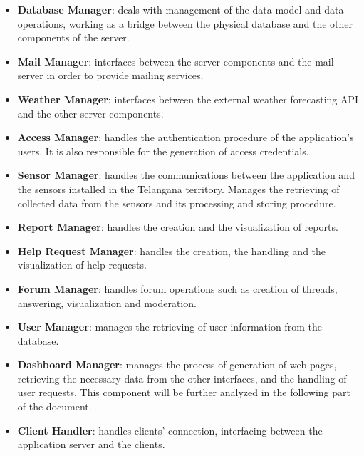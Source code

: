 \documentclass[10pt]{article} %
\begin{document}
\begin{itemize}
    \item \textbf{Database Manager}: deals with management of the data model and data operations, working as a bridge between the physical database 
    and the other components of the server.
    \item \textbf{Mail Manager}: interfaces between the server components and the mail server in order to provide mailing services.
    \item \textbf{Weather Manager}: interfaces between the external weather forecasting API and the other server components.
    \item \textbf{Access Manager}: handles the authentication procedure of the application's users. It is also responsible for the generation of access credentials.
    \item \textbf{Sensor Manager}: handles the communications between the application and the sensors installed in the Telangana territory. Manages the retrieving of 
        collected data from the sensors and its processing and storing procedure.
    \item \textbf{Report Manager}: handles the creation and the visualization of reports.
    \item \textbf{Help Request Manager}: handles the creation, the handling and the visualization of help requests.
    \item \textbf{Forum Manager}: handles forum operations such as creation of threads, answering, visualization and moderation.
    \item \textbf{User Manager}: manages the retrieving of user information from the database.
    \item \textbf{Dashboard Manager}: manages the process of generation of web pages, retrieving the necessary data from the other interfaces, and the handling of user requests. 
        This component will be further analyzed in the following part of the document.
    \item \textbf{Client Handler}: handles clients' connection, interfacing between the application server and the clients.
\end{itemize}
\end{document}
